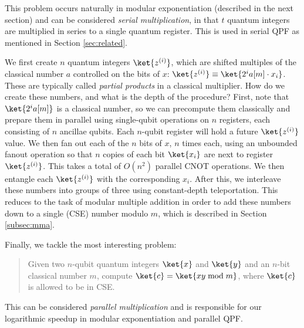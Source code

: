 This problem occurs naturally in modular exponentiation (described in
the next section) and can be considered \emph{serial multiplication},
in that $t$ quantum integers are multiplied in series to a single
quantum register. This is used in serial QPF as mentioned in
Section \ref{sec:related}.


We first create $n$ quantum integers $\ket{z^{(i)}}$,
which are shifted multiples of the classical number $a$ controlled on the bits
of $x$:
$\ket{z^{(i)}} \equiv \ket{2^i a[m] \cdot x_i }$.
These are typically called \emph{partial products} in a classical multiplier.
How do we create these numbers, and what is the depth of the procedure?
First, note that $\ket{2^i a[m]}$ is a classical number, so we can
precompute them classically and prepare them in parallel using single-qubit
operations
on $n$ registers, each consisting of $n$ ancillae qubits. Each $n$-qubit
register will hold a future $\ket{z^{(i)}}$ value.
We then fan out each of the
$n$ bits of $x$, $n$ times each, using an unbounded fanout operation so that
$n$ copies of each bit $\ket{x_i}$ are next to register $\ket{z^{(i)}}$.
This takes a total of $O(n^2)$ parallel CNOT operations.
We then entangle each $\ket{z^{(i)}}$ with the corresponding $x_i$.
After this, we interleave these numbers into groups of three using
constant-depth teleportation. This reduces to the task of modular
multiple addition in order to add these numbers down to a single
(CSE) number modulo $m$, which is described in Section \ref{subsec:mma}.


Finally, we tackle the most interesting problem:
\begin{quote}
Given two $n$-qubit quantum integers $\ket{x}$ and
$\ket{y}$ and an $n$-bit classical number
$m$,
compute $\ket{c} = \ket{xy \bmod m}$,
where $\ket{c}$ is allowed to be in CSE.
\end{quote}

This can be considered \emph{parallel multiplication} and is responsible
for our logarithmic speedup in modular exponentiation and parallel QPF.


